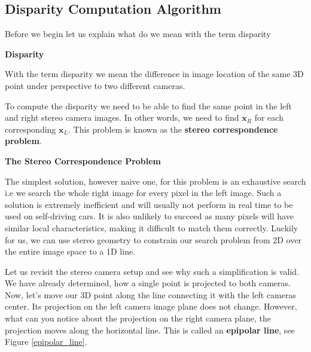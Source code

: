\subsection{Disparity Computation Algorithm}
\label{disparity_computation}

Before we begin let us explain what do we mean with the term disparity


\begin{framed}
\begin{definition}{\textbf{Disparity}}

With the term  disparity we mean the difference in image location of the
same 3D point under perspective to two different cameras.
\end{definition}
\end{framed}

To compute the disparity we need to be able to find the same point in the left and right stereo camera images. 
In other words, we need to find $\mathbf{x}_R$ for each corresponding $\mathbf{x}_L$.
This problem is known as the \textbf{stereo correspondence problem}. 


\begin{framed}
\begin{remark}{\textbf{The Stereo Correspondence Problem}}


\end{remark}
\end{framed}

The simplest solution, however naive one,  for this problem is
an exhaustive search i.e  we search the whole right image for every pixel in the left image. Such a solution is extremely
inefficient and will usually not perform in real time to be used on self-driving cars. It is also unlikely to succeed as many pixels will have
similar local characteristics, making it difficult to match them correctly. Luckily for us, we can use stereo geometry 
to constrain our search problem from 2D over the entire image space to a 1D line. 

Let us revisit the stereo camera setup and see why such a
simplification is valid. We have already determined, how a single point is
projected to both cameras. Now, let's move our 3D point along the line connecting it with the left cameras center. 
Its projection on the left camera image plane does not change. However, what can
you notice about the projection on the right camera plane, the projection moves along the horizontal line. 
This is called an \textbf{epipolar line}, see Figure \ref{epipolar_line}.

